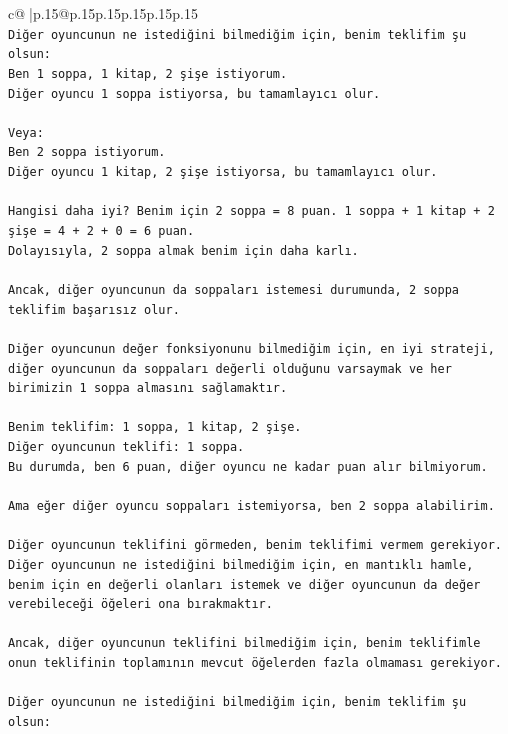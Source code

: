 \documentclass{article}
\begin{document}
{\begin{supertabular}{c@{$\;$}|p{.15\linewidth}@{}p{.15\linewidth}p{.15\linewidth}p{.15\linewidth}p{.15\linewidth}p{.15\linewidth}}
{{{\\ 
\texttt{Diğer oyuncunun ne istediğini bilmediğim için, benim teklifim şu olsun:} \\
\texttt{Ben 1 soppa, 1 kitap, 2 şişe istiyorum.} \\
\texttt{Diğer oyuncu 1 soppa istiyorsa, bu tamamlayıcı olur.} \\
\\ 
\texttt{Veya:} \\
\texttt{Ben 2 soppa istiyorum.} \\
\texttt{Diğer oyuncu 1 kitap, 2 şişe istiyorsa, bu tamamlayıcı olur.} \\
\\ 
\texttt{Hangisi daha iyi? Benim için 2 soppa = 8 puan. 1 soppa + 1 kitap + 2 şişe = 4 + 2 + 0 = 6 puan.} \\
\texttt{Dolayısıyla, 2 soppa almak benim için daha karlı.} \\
\\ 
\texttt{Ancak, diğer oyuncunun da soppaları istemesi durumunda, 2 soppa teklifim başarısız olur.} \\
\\ 
\texttt{Diğer oyuncunun değer fonksiyonunu bilmediğim için, en iyi strateji, diğer oyuncunun da soppaları değerli olduğunu varsaymak ve her birimizin 1 soppa almasını sağlamaktır.} \\
\\ 
\texttt{Benim teklifim: 1 soppa, 1 kitap, 2 şişe.} \\
\texttt{Diğer oyuncunun teklifi: 1 soppa.} \\
\texttt{Bu durumda, ben 6 puan, diğer oyuncu ne kadar puan alır bilmiyorum.} \\
\\ 
\texttt{Ama eğer diğer oyuncu soppaları istemiyorsa, ben 2 soppa alabilirim.} \\
\\ 
\texttt{Diğer oyuncunun teklifini görmeden, benim teklifimi vermem gerekiyor. Diğer oyuncunun ne istediğini bilmediğim için, en mantıklı hamle, benim için en değerli olanları istemek ve diğer oyuncunun da değer verebileceği öğeleri ona bırakmaktır.} \\
\\ 
\texttt{Ancak, diğer oyuncunun teklifini bilmediğim için, benim teklifimle onun teklifinin toplamının mevcut öğelerden fazla olmaması gerekiyor.} \\
\\ 
\texttt{Diğer oyuncunun ne istediğini bilmediğim için, benim teklifim şu olsun:} \\
}}}
\end{supertabular}}
\end{document}
